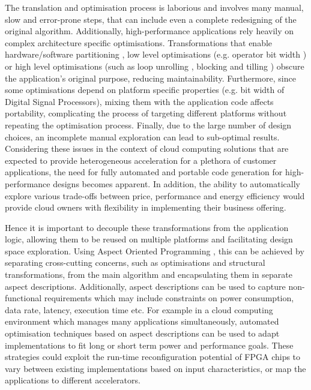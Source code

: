 The translation and optimisation process is laborious and involves
many manual, slow and error-prone steps, that can include even a
complete redesigning of the original algorithm. Additionally,
high-performance applications rely heavily on complex architecture
specific optimisations. Transformations that enable hardware/software
partitioning \cite{Lam:Coutinho:Luk:2008}, low level optimisations
(e.g. operator bit width \cite{Cardoso:Diniz:Weinhardt:2010}) or high
level optimisations (such as loop unrolling \cite{aho1977principles},
blocking and tilling \cite{wolfe1995high}) obscure the application's
original purpose, reducing maintainability. Furthermore, since some
optimisations depend on platform specific properties (e.g. bit width
of Digital Signal Processors), mixing them with the application code
affects portability, complicating the process of targeting different
platforms without repeating the optimisation process. Finally, due to
the large number of design choices, an incomplete manual exploration
can lead to sub-optimal results. Considering these issues in the
context of cloud computing solutions that are expected to provide
heterogeneous acceleration for a plethora of customer applications,
the need for fully automated and portable code generation for
high-performance designs becomes apparent. In addition, the ability to
automatically explore various trade-offs between price, performance
and energy efficiency would provide cloud owners with flexibility in
implementing their business offering.

Hence it is important to decouple these transformations from the
application logic, allowing them to be reused on multiple platforms
and facilitating design space exploration. Using Aspect Oriented
Programming \cite{Kiczales:Lamping:Mendhekar:Maeda:Lopes:1997}, this
can be achieved by separating cross-cutting concerns, such as
optimisations and structural transformations, from the main algorithm
and encapsulating them in separate aspect descriptions.  Additionally,
aspect descriptions can be used to capture non-functional requirements
which may include constraints on power consumption, data rate,
latency, execution time etc. For example in a cloud computing
environment which manages many applications simultaneously, automated
optimisation techniques based on aspect descriptions can be used to
adapt implementations to fit long or short term power and performance
goals. These strategies could exploit the run-time reconfiguration
potential of FPGA chips to vary between existing implementations based
on input characteristics, or map the applications to different
accelerators.

